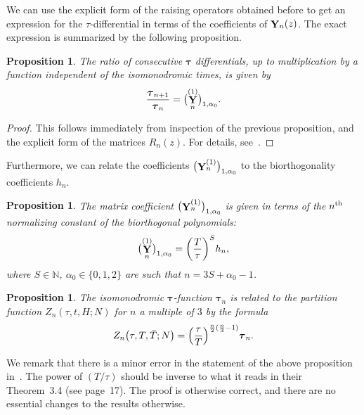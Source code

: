 \documentclass[10pt,a4paper]{amsart}
\DeclareMathOperator{\YY}{{\bf Y}}
\numberwithin{equation}{section}
\newtheorem{Proposition}[Theorem]{Proposition}
 { \theoremstyle{definition}
\newtheorem{Definition}[Theorem]{Definition}
\newtheorem{Note}[Theorem]{Note}
\newtheorem{Example}[Theorem]{Example}
\newtheorem{Remark}[Theorem]{Remark} }
\begin{document}
We can use the explicit form of the raising operators obtained before to get an expression for the $\tau$-differential in terms of the coefficients of
$\YY_n(z)$. The exact expression is summarized by the following proposition.
\begin{Proposition}
 The ratio of consecutive $\boldsymbol{\tau}$ differentials, up to multiplication by a function independent of the isomonodromic times, is given by
 \begin{equation*}
 \frac{\boldsymbol{\tau}_{n+1}}{\boldsymbol{\tau}_n} = \bigl(\YY_{n}^{(1)}\bigr)_{1,\alpha_0}.
 \end{equation*}
\end{Proposition}
\begin{proof}
 This follows immediately from inspection of the previous proposition, and the explicit form of the matrices $R_n(z)$. For details, see~\cite{Bertola-Marchal}.
\end{proof}

Furthermore, we can relate the coefficients $\bigl(\YY_{n}^{(1)}\bigr)_{1,\alpha_0}$ to the biorthogonality coefficients $h_n$.
\begin{Proposition}
 The matrix coefficient $\bigl(\YY_{n}^{(1)}\bigr)_{1,\alpha_0}$ is given in terms of the $n^{\rm th}$ normalizing constant of the biorthogonal polynomials:
 \begin{equation*}
 \bigl(\YY_{n}^{(1)}\bigr)_{1,\alpha_0} = \biggl(\frac{T}{\tau}\biggr)^S h_n,
 \end{equation*}
 where $S\in \mathbb{N}$, $\alpha_0 \in \{0,1,2\}$ are such that $n = 3S + \alpha_0 -1$.
\end{Proposition}


\begin{Proposition}
 The isomonodromic $\boldsymbol{\tau}$-function $\boldsymbol{\tau}_n$ is related to the partition function $Z_n(\tau,t,\allowbreak H;N)$ for $n$ a multiple of $3$ by
 the formula
 \begin{equation*}
 Z_n\bigl(\tau,T,\bar{T};N\bigr) = \Bigl(\frac{\tau}{T}\Bigr)^{\frac{n}{2}(\frac{n}{3}-1)} \boldsymbol{\tau}_n.
 \end{equation*}
\end{Proposition}
\begin{Remark}
 We remark that there is a minor error in the statement of the above proposition in~\cite{Bertola-Marchal}. The power of $(T/\tau)$ should be inverse to what it reads in their Theorem~3.4 (see page~17). The proof is otherwise correct, and there are no essential changes to the results otherwise.
\end{Remark}
\end{document}
